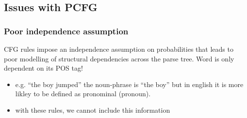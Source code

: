 \documentclass[11pt]{article}
\begin{document}
\subsection{Issues with PCFG}

\subsubsection{Poor independence assumption}

CFG rules impose an independence assumption on probabilities that leads to poor modelling of structural dependencies across the parse tree. Word is only dependent on its POS tag!

\begin{minipage}[l]{.5\linewidth}
    \begin{figure}[H]
        \centering
    \end{figure}    
\end{minipage}\hfill
\begin{minipage}[r]{.48\linewidth}
    \begin{itemize}
        \item e.g. ``the boy jumped'' the noun-phrase is ``the boy'' but in english it is more likley to be defined as pronominal (pronoun).
        \item with these rules, we cannot include this information
    \end{itemize}
\end{minipage}
\end{document}

